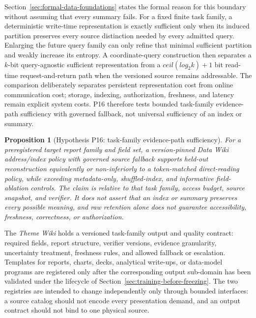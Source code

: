 \documentclass[11pt]{article}
\newtheorem{proposition}{Proposition}
\begin{document}
Section~\ref{sec:formal-data-foundations} states the formal reason for this boundary without assuming that every summary fails. For a fixed finite task family, a deterministic write-time representation is exactly sufficient only when its induced partition preserves every source distinction needed by every admitted query. Enlarging the future query family can only refine that minimal sufficient partition and weakly increase its entropy. A coordinate-query construction then separates a $k$-bit query-agnostic sufficient representation from a $ceil(log_2 k)+1$ bit read-time request-and-return path when the versioned source remains addressable. The comparison deliberately separates persistent representation cost from online communication cost; storage, indexing, authorization, freshness, and latency remain explicit system costs. P16 therefore tests bounded task-family evidence-path sufficiency with governed fallback, not universal sufficiency of an index or summary.

\begin{proposition}[Hypothesis P16: task-family evidence-path sufficiency]
\label{prop:p16}
For a preregistered target report family and field set, a version-pinned Data Wiki address/index policy with governed source fallback supports held-out reconstruction equivalently or non-inferiorly to a token-matched direct-reading policy, while exceeding metadata-only, shuffled-index, and informative field-ablation controls. The claim is relative to that task family, access budget, source snapshot, and verifier. It does not assert that an index or summary preserves every possible meaning, and raw retention alone does not guarantee accessibility, freshness, correctness, or authorization.
\end{proposition}

The \textit{Theme Wiki} holds a versioned task-family output and quality contract: required fields, report structure, verifier versions, evidence granularity, uncertainty treatment, freshness rules, and allowed fallback or escalation. Templates for reports, charts, decks, analytical write-ups, or data-model programs are registered only after the corresponding output sub-domain has been validated under the lifecycle of Section~\ref{sec:training-before-freezing}. The two registries are intended to change independently only through bounded interfaces: a source catalog should not encode every presentation demand, and an output contract should not bind to one physical source.
\end{document}
